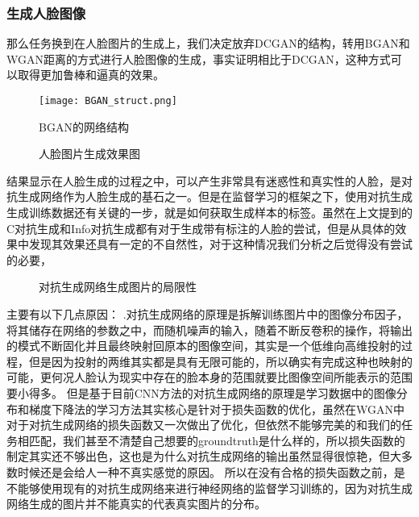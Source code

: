 \subsubsection{生成人脸图像}
那么任务换到在人脸图片的生成上，我们决定放弃DCGAN的结构，转用BGAN\cite{BGAN}和WGAN距离\cite{WGAN}的方式进行人脸图像的生成，事实证明相比于DCGAN，这种方式可以取得更加鲁棒和逼真的效果。
\begin{figure}[h]
  \centering
    \texttt{[image: BGAN\_struct.png]}
  \caption{BGAN的网络结构}
\end{figure}

\begin{figure}[!ht]
 \centering 
	\caption{人脸图片生成效果图}
\end{figure}
结果显示在人脸生成的过程之中，可以产生非常具有迷惑性和真实性的人脸，是对抗生成网络作为人脸生成的基石之一。但是在监督学习的框架之下，使用对抗生成生成训练数据还有关键的一步，就是如何获取生成样本的标签。虽然在上文提到的C对抗生成和Info对抗生成都有对于生成带有标注的人脸的尝试，但是从具体的效果中发现其效果还具有一定的不自然性，对于这种情况我们分析之后觉得没有尝试的必要，
\begin{figure}[h]
\centering
{}
\caption{对抗生成网络生成图片的局限性}
\end{figure}

主要有以下几点原因：
.对抗生成网络的原理是拆解训练图片中的图像分布因子，将其储存在网络的参数之中，而随机噪声的输入，随着不断反卷积的操作，将输出的模式不断固化并且最终映射回原本的图像空间，其实是一个低维向高维投射的过程，但是因为投射的两维其实都是具有无限可能的，所以确实有完成这种也映射的可能，更何况人脸认为现实中存在的脸本身的范围就要比图像空间所能表示的范围要小得多。
但是基于目前CNN方法的对抗生成网络的原理是学习数据中的图像分布和梯度下降法的学习方法其实核心是针对于损失函数的优化，虽然在WGAN中对于对抗生成网络的损失函数又一次做出了优化，但依然不能够完美的和我们的任务相匹配，我们甚至不清楚自己想要的groundtruth是什么样的，所以损失函数的制定其实还不够出色，这也是为什么对抗生成网络的输出虽然显得很惊艳，但大多数时候还是会给人一种不真实感觉的原因。
所以在没有合格的损失函数之前，是不能够使用现有的对抗生成网络来进行神经网络的监督学习训练的，因为对抗生成网络生成的图片并不能真实的代表真实图片的分布。

